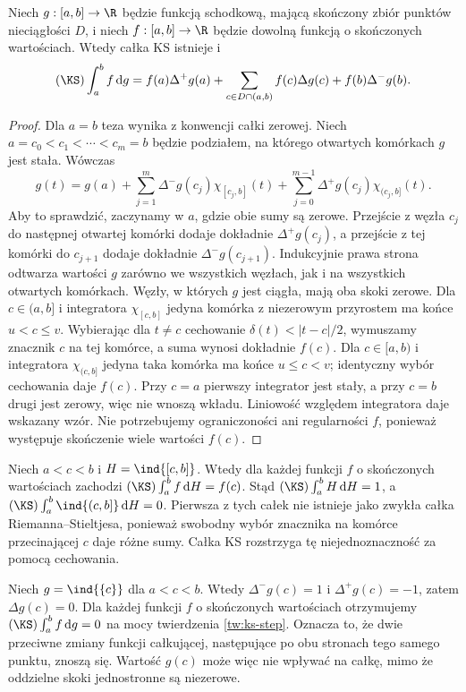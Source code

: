 \begin{twierdzenie}
\label{tw:ks-step}
Niech $g:[a,b]\to\R$ będzie funkcją schodkową, mającą skończony zbiór punktów nieciągłości $D$, i niech $f:[a,b]\to\R$ będzie dowolną funkcją o skończonych wartościach. Wtedy całka KS istnieje i
\[
 (\KS)\int_a^b f\,\mathrm dg
 =f(a)\Delta^+g(a)+\sum_{c\in D\cap(a,b)}f(c)\Delta g(c)+f(b)\Delta^-g(b).
\]
\end{twierdzenie}
\begin{proof}
Dla $a=b$ teza wynika z konwencji całki zerowej. Niech $a=c_0<c_1<\cdots<c_m=b$ będzie podziałem, na którego otwartych komórkach $g$ jest stała. Wówczas
\[
 g(t)=g(a)+\sum_{j=1}^m\Delta^-g(c_j)\chi_{[c_j,b]}(t)
 +\sum_{j=0}^{m-1}\Delta^+g(c_j)\chi_{(c_j,b]}(t).
\]
Aby to sprawdzić, zaczynamy w $a$, gdzie obie sumy są zerowe. Przejście z węzła $c_j$ do następnej otwartej komórki dodaje dokładnie $\Delta^+g(c_j)$, a przejście z tej komórki do $c_{j+1}$ dodaje dokładnie $\Delta^-g(c_{j+1})$. Indukcyjnie prawa strona odtwarza wartości $g$ zarówno we wszystkich węzłach, jak i na wszystkich otwartych komórkach. Węzły, w których $g$ jest ciągła, mają oba skoki zerowe. Dla $c\in(a,b]$ i integratora $\chi_{[c,b]}$ jedyna komórka z niezerowym przyrostem ma końce $u<c\le v$. Wybierając dla $t\ne c$ cechowanie $\delta(t)<|t-c|/2$, wymuszamy znacznik $c$ na tej komórce, a suma wynosi dokładnie $f(c)$. Dla $c\in[a,b)$ i integratora $\chi_{(c,b]}$ jedyna taka komórka ma końce $u\le c<v$; identyczny wybór cechowania daje $f(c)$. Przy $c=a$ pierwszy integrator jest stały, a przy $c=b$ drugi jest zerowy, więc nie wnoszą wkładu. Liniowość względem integratora daje wskazany wzór. Nie potrzebujemy ograniczoności ani regularności $f$, ponieważ występuje skończenie wiele wartości $f(c)$.
\end{proof}

\begin{przyklad}
Niech $a<c<b$ i $H=\ind{[c,b]}$. Wtedy dla każdej funkcji $f$ o skończonych wartościach zachodzi $(\KS)\int_a^b f\,\mathrm dH=f(c)$. Stąd $(\KS)\int_a^b H\,\mathrm dH=1$, a $(\KS)\int_a^b\ind{(c,b]}\,\mathrm dH=0$. Pierwsza z tych całek nie istnieje jako zwykła całka Riemanna--Stieltjesa, ponieważ swobodny wybór znacznika na komórce przecinającej $c$ daje różne sumy. Całka KS rozstrzyga tę niejednoznaczność za pomocą cechowania.
\end{przyklad}

\begin{przyklad}
Niech $g=\ind{\{c\}}$ dla $a<c<b$. Wtedy $\Delta^-g(c)=1$ i $\Delta^+g(c)=-1$, zatem $\Delta g(c)=0$. Dla każdej funkcji $f$ o skończonych wartościach otrzymujemy $(\KS)\int_a^b f\,\mathrm dg=0$ na mocy twierdzenia \ref{tw:ks-step}. Oznacza to, że dwie przeciwne zmiany funkcji całkującej, następujące po obu stronach tego samego punktu, znoszą się. Wartość $g(c)$ może więc nie wpływać na całkę, mimo że oddzielne skoki jednostronne są niezerowe.
\end{przyklad}

